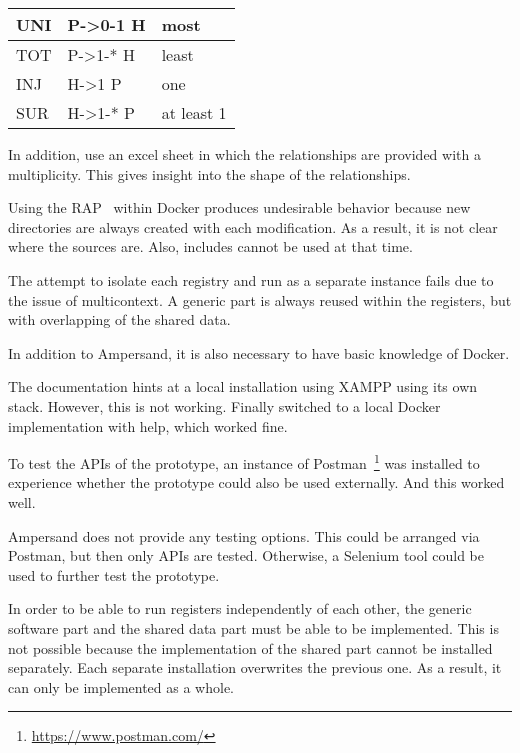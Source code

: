 \begin{tabular}{ || l | l | l ||}
    \hline
    UNI & P->0-1 H &  most\\  \hline    
    TOT & P->1-* H  & least\\  \hline
    INJ & H->1 P  &   one\\  \hline
    SUR & H->1-* P &  at least 1\\ \hline
    \end{tabular}
    
In addition, use an excel sheet in which the relationships are provided with a multiplicity.
This gives insight into the shape of the relationships.

Using the RAP~ within Docker produces undesirable behavior because new directories are always created with each modification.
As a result, it is not clear where the sources are.
Also, includes cannot be used at that time.

The attempt to isolate each registry and run as a separate instance fails due to the issue of multicontext.
A generic part is always reused within the registers, but with overlapping of the shared data.

In addition to Ampersand, it is also necessary to have basic knowledge of Docker.

The documentation hints at a local installation using XAMPP using its own stack.
However, this is not working.
Finally switched to a local Docker implementation with help, which worked fine.

To test the APIs of the prototype, an instance of Postman~\footnote{\url{https://www.postman.com/}} was installed to experience whether the prototype could also be used externally.
And this worked well.

Ampersand does not provide any testing options.
This could be arranged via Postman, but then only APIs are tested.
Otherwise, a Selenium tool could be used to further test the prototype.

In order to be able to run registers independently of each other, the generic software part and the shared data part must be able to be implemented.
This is not possible because the implementation of the shared part cannot be installed separately.
Each separate installation overwrites the previous one.
As a result, it can only be implemented as a whole.


